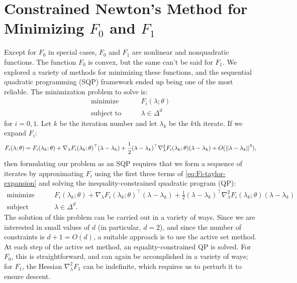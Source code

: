 \documentclass[eikonal.tex]{subfiles}
\begin{document}
\section{Constrained Newton's Method for Minimizing $F_0$ and $F_1$}

Except for $F_0$ in special cases, $F_0$ and $F_1$ are nonlinear and
nonquadratic functions. The function $F_0$ is convex, but the same
can't be said for $F_1$. We explored a variety of methods for
minimizing these functions, and the sequential quadratic programming
(SQP) framework ended up being one of the most reliable. The
minimization problem to solve is:
\begin{align*}
  \mbox{minimize} & \qquad F_i(\lambda; \theta) \\
  \mbox{subject to} & \qquad \lambda \in \Delta^d
\end{align*}
for $i = 0, 1$. Let $k$ be the iteration number and let $\lambda_k$ be
the $k$th iterate. If we expand $F_i$:
\begin{align}\label{eq:Fi-taylor-expansion}
  F_i(\lambda; \theta) = F_i(\lambda_k; \theta) + \nabla_\lambda F_i(\lambda_k; \theta)^\top (\lambda - \lambda_k) + \frac{1}{2} {(\lambda - \lambda_k)}^\top \nabla_\lambda^2 F_i(\lambda_k; \theta) {(\lambda - \lambda_k)} + O(\left|\left|\lambda - \lambda_k\right|\right|^3),
\end{align}
then formulating our problem as an SQP requires that we form a
sequence of iterates by approximating $F_i$ using the first three
terms of \cref{eq:Fi-taylor-expansion} and solving the
inequality-constrained quadratic program (QP):
\begin{align*}
  \mbox{minimize} & \qquad F_i(\lambda_k; \theta) + \nabla_\lambda F_i(\lambda_k; \theta)^\top (\lambda - \lambda_k) + \frac{1}{2} {(\lambda - \lambda_k)}^\top \nabla_\lambda^2 F_i(\lambda_k; \theta) {(\lambda - \lambda_k)} \\
  \mbox{subject to} & \qquad \lambda \in \Delta^d.
\end{align*}
The solution of this problem can be carried out in a variety of
ways. Since we are interested in small values of $d$ (in particular,
$d = 2$), and since the number of constraints is $d + 1 = O(d)$, a
suitable approach is to use the active set method. At each step of the
active set method, an equality-constrained QP is solved. For $F_0$,
this is straightforward, and can again be accomplished in a variety of
ways; for $F_1$, the Hessian $\nabla_\lambda^2 F_1$ can be indefinite,
which requires us to perturb it to ensure descent.
\end{document}

